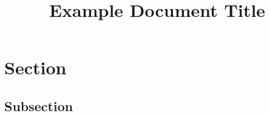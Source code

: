 \documentclass[oneside, a4paper, 12pt]{amsart}
\title{Example Document Title}
\begin{document}
\begin{abstract}
  \lipsum[1]
\end{abstract}

\maketitle

\tableofcontents
{}


\section{Section}

\lipsum[2]
\cite{MacLane1998}

\subsection{Subsection}

\lipsum[3]

\printbibliography
\end{document}
